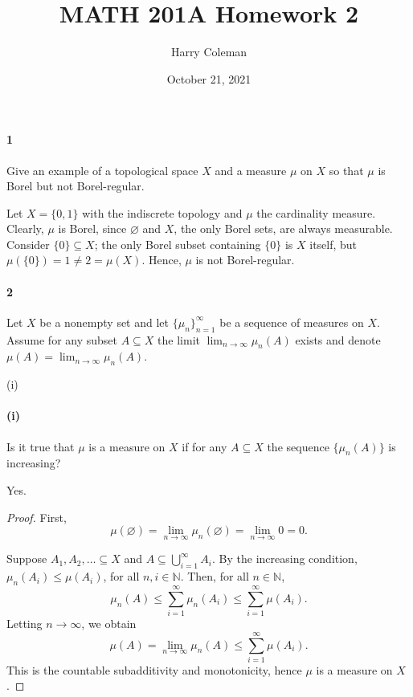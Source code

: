 \documentclass[12pt]{article}
\renewcommand{\maketitle}{\thispagestyle{title}}
\newlength{\myparskip}
\newenvironment{fullbox}{\begin{lrbox}{\savefullbox}\begin{minipage}{\dimexpr\textwidth-2\fboxsep\relax}\setlength{\parskip}{\myparskip}}{\end{minipage}\end{lrbox}\framebox[\textwidth]{\usebox{\savefullbox}}}
\newenvironment{pbox}[1][]{\begin{fullbox}\ifx#1\empty\else\paragraph{#1}\fi}{\end{fullbox}}
\newcommand{\N}{\mathbb{N}}
\renewcommand{\emptyset}{\varnothing}
\newcommand{\<}{\langle}
\renewcommand{\>}{\rangle}
\begin{document}
\title{MATH 201A Homework 2}
\author{Harry Coleman}
\date{October 21, 2021}
\maketitle

\begin{pbox}[1]
    Give an example of a topological space $X$ and a measure $\mu$ on $X$ so that $\mu$ is Borel but not Borel-regular.
\end{pbox}

Let $X = \{0, 1\}$ with the indiscrete topology and $\mu$ the cardinality measure. Clearly, $\mu$ is Borel, since $\emptyset$ and $X$, the only Borel sets, are always measurable. Consider $\{0\} \subseteq X$; the only Borel subset containing $\{0\}$ is $X$ itself, but $\mu(\{0\}) = 1 \ne 2 = \mu(X)$. Hence, $\mu$ is not Borel-regular.



\begin{pbox}[2]
    Let $X$ be a nonempty set and let $\{\mu_n\}_{n=1}^{\infty}$ be a sequence of measures on $X$. Assume for any subset $A \subseteq X$ the limit $\lim_{n \to \infty} \mu_n(A)$ exists and denote $\mu(A) = \lim_{n \to \infty} \mu_n(A)$.
\end{pbox}

\begin{pbox}[(i)]
    Is it true that $\mu$ is a measure on $X$ if for any $A \subseteq X$ the sequence $\{\mu_n(A)\}$ is increasing?
\end{pbox}

Yes.

\begin{proof}
    First,
    \[
        \mu(\emptyset)
            = \lim_{n \to \infty} \mu_n(\emptyset)
            = \lim_{n \to \infty} 0
            = 0.
    \]
    

    Suppose $A_1, A_2, \ldots \subseteq X$ and $A \subseteq \bigcup_{i=1}^{\infty} A_i$. By the increasing condition, $\mu_n(A_i) \leq \mu(A_i)$, for all $n, i \in \N$. Then, for all $n \in \N$,
    \[
        \mu_n(A)
            \leq \sum_{i=1}^{\infty} \mu_n(A_i)
            \leq \sum_{i=1}^{\infty} \mu(A_i).
    \]
    Letting $n \to \infty$, we obtain
    \[
        \mu(A)
            = \lim_{n \to \infty} \mu_n(A)
            \leq \sum_{i=1}^{\infty} \mu(A_i).
    \]
    This is the countable subadditivity and monotonicity, hence $\mu$ is a measure on $X$.

\end{proof}
\end{document}
